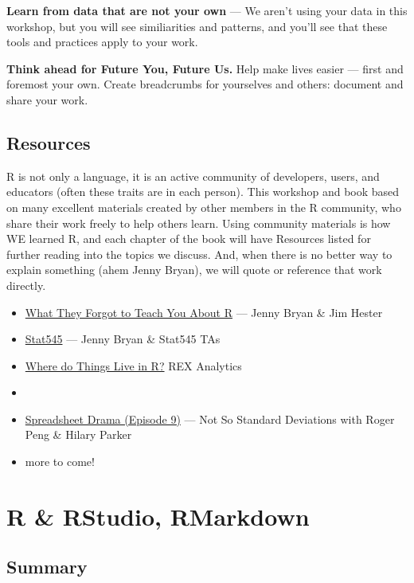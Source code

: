 \documentclass[]{book}
\providecommand{\tightlist}{%
  \setlength{\itemsep}{0pt}\setlength{\parskip}{0pt}}
\begin{document}
\textbf{Learn from data that are not your own} --- We aren't using your data in this workshop, but you will see similiarities and patterns, and you'll see that these tools and practices apply to your work.

\textbf{Think ahead for Future You, Future Us.} Help make lives easier --- first and foremost your own. Create breadcrumbs for yourselves and others: document and share your work.

\hypertarget{resources}{%
\section{Resources}\label{resources}}

R is not only a language, it is an active community of developers, users, and educators (often these traits are in each person). This workshop and book based on many excellent materials created by other members in the R community, who share their work freely to help others learn. Using community materials is how WE learned R, and each chapter of the book will have Resources listed for further reading into the topics we discuss. And, when there is no better way to explain something (ahem Jenny Bryan), we will quote or reference that work directly.

\begin{itemize}
\tightlist
\item
  \href{https://whattheyforgot.org/}{What They Forgot to Teach You About R} --- Jenny Bryan \& Jim Hester
\item
  \href{https://stat545.com/}{Stat545} --- Jenny Bryan \& Stat545 TAs
\item
  \href{http://rex-analytics.com/things-live-r-r-excel-users/}{Where do Things Live in R?} REX Analytics
\item
  \href{https://blog.shotwell.ca/posts/r_for_excel_users/}{}
\item
  \href{http://nssdeviations.com/episode-9-spreadsheet-drama}{Spreadsheet Drama (Episode 9)} --- Not So Standard Deviations with Roger Peng \& Hilary Parker
\item
  more to come!
\end{itemize}

\hypertarget{rstudio}{%
\chapter{R \& RStudio, RMarkdown}\label{rstudio}}

\hypertarget{summary}{%
\section{Summary}\label{summary}}
\end{document}
